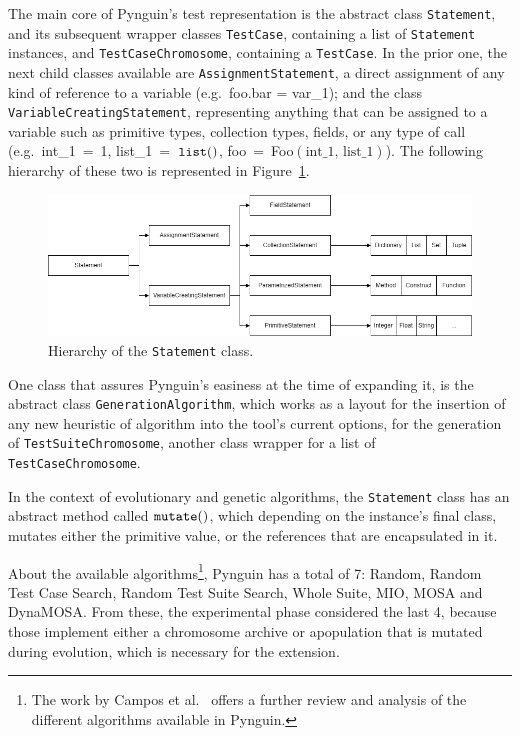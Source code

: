 \documentclass[%
  chapterprefix=false,%
  open=right,%
  twoside=true,%
  paper=a4,%
  logofile={Figures/logo.png},%
  thesistype=master,%
  UKenglish,%
]{se2thesis}
\newcommand{\classname}[1]{\texttt{#1}}
\newcommand{\callable}[2][]{\(\text{\texttt{#2}}(#1)\)}
\begin{document}
The main core of Pynguin's test representation is the abstract class \classname{Statement}, and its subsequent wrapper classes \classname{TestCase}, containing a list of \classname{Statement} instances, and \classname{TestCaseChromosome}, containing a \classname{TestCase}.
In the prior one, the next child classes available are \classname{AssignmentStatement}, a direct assignment of any kind of reference to a variable (e.g.~foo.bar = var\_1); and the class  \classname{VariableCreatingStatement}, representing anything that can be assigned to a variable such as primitive types, collection types, fields, or any type of call (e.g.~int\_1~=~1, list\_1~=~\callable{list}, foo~=~Foo\((\text{int\_1,~list\_1})\)).
The following hierarchy of these two is represented in Figure~\ref{fig:hierarchy}.

\begin{figure}[htb]\label{fig:hierarchy}
  \centering
  \includegraphics[width=1\textwidth]{Figures/statement_hierarchy2.png}
  \vspace*{0.5cm}
  \caption{Hierarchy of the \classname{Statement} class.}
\end{figure}

One class that assures Pynguin's easiness at the time of expanding it, is the abstract class \classname{GenerationAlgorithm}, which works as a layout for the insertion of any new heuristic of algorithm into the tool's current options, for the generation of \classname{TestSuiteChromosome}, another class wrapper for a list of \classname{TestCaseChromosome}.

In the context of evolutionary and genetic algorithms, the \classname{Statement} class has an abstract method called \callable{mutate}, which depending on the instance's final class, mutates either the primitive value, or the references that are encapsulated in it.

About the available algorithms\footnote{The work by Campos et al.~\cite{DBLP:journals/infsof/CamposGAFEA18} offers a further review and analysis of the different algorithms available in Pynguin.}, Pynguin has a total of 7: Random, Random Test Case Search, Random Test Suite Search, Whole Suite, MIO, MOSA and DynaMOSA.\@
From these, the experimental phase considered the last 4, because those implement either a chromosome archive or apopulation that is mutated during evolution, which is necessary for the extension.
\end{document}
